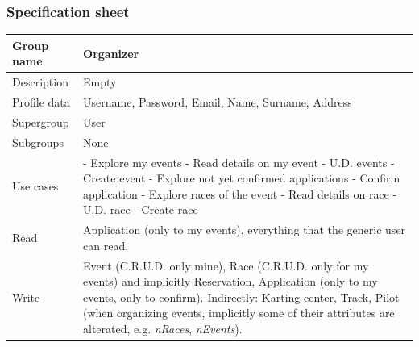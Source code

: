 \documentclass{beamer}
\begin{document}
\begin{frame}
    \frametitle{Specification sheet}
    \begin{table}
        \tiny
        \begin{tabular}{|p{2cm}|p{6cm}|}
        \hline
        Group name & \textbf{Organizer} \\
        \hline
        Description & Empty \\
        \hline
        Profile data & Username, Password, Email, Name, Surname, Address \\
        \hline
        Supergroup & User \\
        \hline
        Subgroups & None \\
        \hline
        Use cases &
        - Explore my events \newline
        - Read details on my event \newline
        - U.D. events \newline
        - Create event \newline
        - Explore not yet confirmed applications \newline
        - Confirm application \newline
        - Explore races of the event \newline
        - Read details on race \newline
        - U.D. race \newline
        - Create race \\
        \hline
        Read & Application (only to my events), everything that the generic user can read. \\
        \hline
        Write & Event (C.R.U.D. only mine), Race (C.R.U.D. only for my events) and implicitly Reservation, Application (only to my events, only to confirm). \newline
        Indirectly: Karting center, Track, Pilot (when organizing events, implicitly some of their 
        attributes are alterated, e.g. \textit{nRaces}, \textit{nEvents}). \\
        \hline
        \end{tabular}
    \end{table}
\end{frame}
\end{document}
